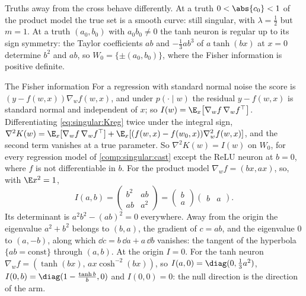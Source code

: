 \begin{refsection}
Truths away from the cross behave differently. At a truth $0<\abs{c_0}<1$ of the product model the true set is a smooth curve: still singular, with $\lambda=\frac12$ but $m=1$. At a truth $(a_0,b_0)$ with $a_0b_0\ne0$ the tanh neuron is regular up to its sign symmetry: the Taylor coefficients $ab$ and $-\frac13ab^3$ of $a\tanh(bx)$ at $x=0$ determine $b^2$ and $ab$, so $W_0=\{\pm(a_0,b_0)\}$, where the Fisher information is positive definite.

\begin{computation}{The Fisher information}\label{comp:singular:fisher}
\step For a regression with standard normal noise the score is $(y-f(w,x))\nabla_wf(w,x)$, and under $p(\cdot\mid w)$ the residual $y-f(w,x)$ is standard normal and independent of $x$; so $I(w)=\E_x\bigl[\nabla_wf\,\nabla_wf^\top\bigr]$.
\step Differentiating \eqref{eq:singular:Kreg} twice under the integral sign, $\nabla^2K(w)=\E_x[\nabla_wf\,\nabla_wf^\top]+\E_x[(f(w,x)-f(w_0,x))\nabla_w^2f(w,x)]$, and the second term vanishes at a true parameter. So $\nabla^2K(w)=I(w)$ on $W_0$, for every regression model of \cref{comp:singular:cast} except the ReLU neuron at $b=0$, where $f$ is not differentiable in $b$.
\step For the product model $\nabla_wf=(bx,ax)$, so, with $\E x^2=1$,
\[
I(a,b)=\begin{pmatrix}b^2&ab\\ab&a^2\end{pmatrix}=\begin{pmatrix}b\\a\end{pmatrix}\begin{pmatrix}b&a\end{pmatrix}.
\]
\step Its determinant is $a^2b^2-(ab)^2=0$ everywhere. Away from the origin the eigenvalue $a^2+b^2$ belongs to $(b,a)$, the gradient of $c=ab$, and the eigenvalue $0$ to $(a,-b)$, along which $\dd c=b\,\dd a+a\,\dd b$ vanishes: the tangent of the hyperbola $\{ab=\text{const}\}$ through $(a,b)$. At the origin $I=0$.
\step For the tanh neuron $\nabla_wf=(\tanh(bx),\,ax\cosh^{-2}(bx))$, so $I(a,0)=\diag(0,\frac13a^2)$, $I(0,b)=\diag(1-\frac{\tanh b}b,0)$ and $I(0,0)=0$: the null direction is the direction of the arm.
\end{computation}


\end{refsection}
